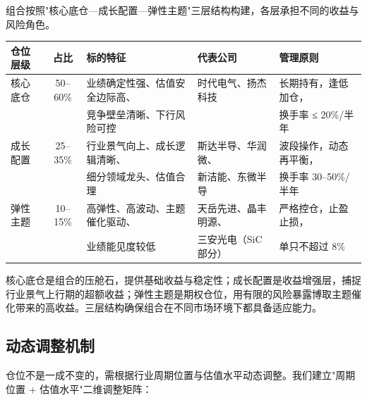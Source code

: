 组合按照"核心底仓—成长配置—弹性主题"三层结构构建，各层承担不同的收益与风险角色。

\begin{exhibitbox}[表 10-6：三层仓位结构与配置原则]
\centering
\small
\begin{tabularx}{\textwidth}{L{2.0cm} c L{3.5cm} L{3.0cm} L{3.5cm}}
\toprule
\textbf{仓位层级} & \textbf{占比} & \textbf{标的特征} & \textbf{代表公司} & \textbf{管理原则} \\
\midrule
{}
核心底仓 & 50–60\% & 业绩确定性强、估值安全边际高、 & 时代电气、扬杰科技 & 长期持有，逢低加仓， \\
& & 竞争壁垒清晰、下行风险可控 & & 换手率 ≤ 20\%/半年 \\
\midrule
{}
成长配置 & 25–35\% & 行业景气向上、成长逻辑清晰、 & 斯达半导、华润微、 & 波段操作，动态再平衡， \\
& & 细分领域龙头、估值合理 & 新洁能、东微半导 & 换手率 30–50\%/半年 \\
\midrule
{}
弹性主题 & 10–15\% & 高弹性、高波动、主题催化驱动、 & 天岳先进、晶丰明源、 & 严格控仓，止盈止损， \\
& & 业绩能见度较低 & 三安光电（SiC 部分） & 单只不超过 8\% \\
\bottomrule
\end{tabularx}
\end{exhibitbox}

核心底仓是组合的压舱石，提供基础收益与稳定性；成长配置是收益增强层，捕捉行业景气上行期的超额收益；弹性主题是期权仓位，用有限的风险暴露博取主题催化带来的高收益。三层结构确保组合在不同市场环境下都具备适应能力。

\subsection{动态调整机制}

仓位不是一成不变的，需根据行业周期位置与估值水平动态调整。我们建立"周期位置 + 估值水平"二维调整矩阵：

